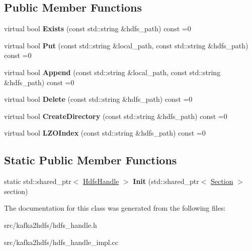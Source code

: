 \subsection*{Public Member Functions}
\begin{DoxyCompactItemize}
\item 
virtual bool {\bfseries Exists} (const std\+::string \&hdfs\+\_\+path) const =0\hypertarget{classlog2hdfs_1_1HdfsHandle_aa9e0f9d3d7d65f11177fadb02ae87988}{}\label{classlog2hdfs_1_1HdfsHandle_aa9e0f9d3d7d65f11177fadb02ae87988}

\item 
virtual bool {\bfseries Put} (const std\+::string \&local\+\_\+path, const std\+::string \&hdfs\+\_\+path) const =0\hypertarget{classlog2hdfs_1_1HdfsHandle_a9bc69036782f91759d7380f9096d0277}{}\label{classlog2hdfs_1_1HdfsHandle_a9bc69036782f91759d7380f9096d0277}

\item 
virtual bool {\bfseries Append} (const std\+::string \&local\+\_\+path, const std\+::string \&hdfs\+\_\+path) const =0\hypertarget{classlog2hdfs_1_1HdfsHandle_a565087c82689cadad87d886ffabc99d2}{}\label{classlog2hdfs_1_1HdfsHandle_a565087c82689cadad87d886ffabc99d2}

\item 
virtual bool {\bfseries Delete} (const std\+::string \&hdfs\+\_\+path) const =0\hypertarget{classlog2hdfs_1_1HdfsHandle_aa8bd7cbe09e716420b55cc1b0948956e}{}\label{classlog2hdfs_1_1HdfsHandle_aa8bd7cbe09e716420b55cc1b0948956e}

\item 
virtual bool {\bfseries Create\+Directory} (const std\+::string \&hdfs\+\_\+path) const =0\hypertarget{classlog2hdfs_1_1HdfsHandle_aee932d7458c2afebcda1a5a249299859}{}\label{classlog2hdfs_1_1HdfsHandle_aee932d7458c2afebcda1a5a249299859}

\item 
virtual bool {\bfseries L\+Z\+O\+Index} (const std\+::string \&hdfs\+\_\+path) const =0\hypertarget{classlog2hdfs_1_1HdfsHandle_a3cff55576ac5171ed844ccb17ccb436e}{}\label{classlog2hdfs_1_1HdfsHandle_a3cff55576ac5171ed844ccb17ccb436e}

\end{DoxyCompactItemize}
\subsection*{Static Public Member Functions}
\begin{DoxyCompactItemize}
\item 
static std\+::shared\+\_\+ptr$<$ \hyperlink{classlog2hdfs_1_1HdfsHandle}{Hdfs\+Handle} $>$ {\bfseries Init} (std\+::shared\+\_\+ptr$<$ \hyperlink{classlog2hdfs_1_1Section}{Section} $>$ section)\hypertarget{classlog2hdfs_1_1HdfsHandle_a3de62a0bfaf781ea4507bef265694ba4}{}\label{classlog2hdfs_1_1HdfsHandle_a3de62a0bfaf781ea4507bef265694ba4}

\end{DoxyCompactItemize}


The documentation for this class was generated from the following files\+:\begin{DoxyCompactItemize}
\item 
src/kafka2hdfs/hdfs\+\_\+handle.\+h\item 
src/kafka2hdfs/hdfs\+\_\+handle\+\_\+impl.\+cc\end{DoxyCompactItemize}
